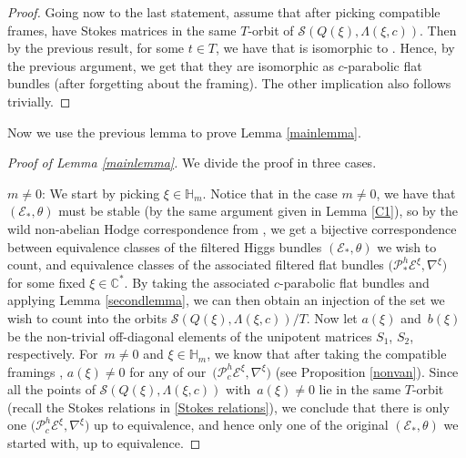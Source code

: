 \documentclass[11pt]{article}
\numberwithin{equation}{section}
\numberwithin{equation}{section}
\begin{document}
\begin{proof}
Going now to the last statement, assume that after picking compatible frames,  have Stokes matrices in the same $T$-orbit of $\mathcal{S}(Q(\xi),\Lambda(\xi,c))$. Then by the previous result, for some $t\in T$, we have that  is isomorphic to . Hence, by the previous argument, we get that they are isomorphic as $c$-parabolic flat bundles (after forgetting about the framing). The other implication also follows trivially.
\end{proof}

Now we use the previous lemma to prove Lemma \ref{mainlemma}.
\begin{proof}[Proof of Lemma \ref{mainlemma}]
We divide the proof in three cases.

$m\neq 0$: We start by picking $\xi \in \mathbb{H}_m$. Notice that in the case $m\neq0$, we have that $(\mathcal{E}_*,\theta)$ must be stable (by the same argument given in Lemma \ref{C1}), so by the wild non-abelian Hodge correspondence from \cite{BB04}, we get a bijective correspondence between equivalence classes of the filtered Higgs bundles $(\mathcal{E}_*,\theta)$ we wish to count, and equivalence classes of the associated filtered flat bundles $\bigl(\mathcal{P}^h_{*}\mathcal{E}^{\xi},\nabla^{\xi}\bigr)$ for some fixed $\xi \in \mathbb{C}^*$. By taking the associated $c$-parabolic flat bundles and applying Lemma \ref{secondlemma}, we can then obtain an injection of the set we wish to count into the orbits $\mathcal{S}(Q(\xi),\Lambda(\xi,c))/T$. Now let $a(\xi)$ and~$b(\xi)$ be the non-trivial off-diagonal elements of the unipotent matrices $S_1$, $S_2$, respectively. For~${m\neq 0}$ and $\xi \in \mathbb{H}_m$, we know that after taking the compatible framings , $a(\xi)\neq 0$ for any of our~${\bigl(\mathcal{P}^h_{c}\mathcal{E}^{\xi},\nabla^{\xi}\bigr)}$ (see Proposition \ref{nonvan}). Since all the points of $\mathcal{S}(Q(\xi),\Lambda(\xi,c))$ with~${a(\xi)\neq 0}$ lie in the same $T$-orbit (recall the Stokes relations in \eqref{Stokes relations}), we conclude that there is only one $\bigl(\mathcal{P}^h_{c}\mathcal{E}^{\xi},\nabla^{\xi}\bigr)$ up to equivalence, and hence only one of the original $(\mathcal{E}_*,\theta)$ we started with, up to equivalence.


\end{proof}
\end{document}
